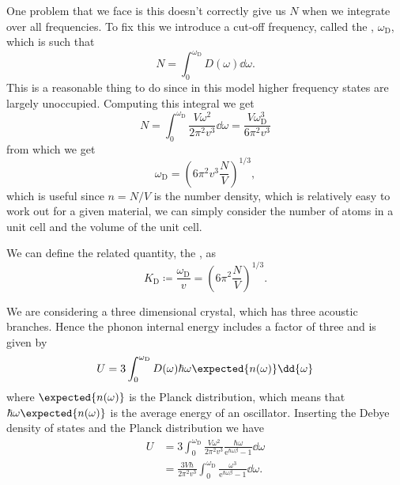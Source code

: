 \documentclass[fleqn]{NotesClass}
\newcommand*{\e}{\mathrm{e}}
\newcommand*{\debye}{\mathrm{D}}
\begin{document}
    One problem that we face is this doesn't correctly give us \(N\) when we integrate over all frequencies.
    To fix this we introduce a cut-off frequency, called the , \(\omega_{\debye}\), which is such that
    \begin{equation}
        N = \int_0^{\omega_{\debye}} D(\omega) \dd{\omega}.
    \end{equation}
    This is a reasonable thing to do since in this model higher frequency states are largely unoccupied.
    Computing this integral we get
    \begin{equation}
        N = \int_{0}^{\omega_{\debye}} \frac{V\omega^2}{2\pi^2v^3} \dd{\omega} = \frac{V\omega_{\debye}^{3}}{6\pi^2v^3}
    \end{equation}
    from which we get
    \begin{equation}
        \omega_{\debye} = (6\pi^2v^3 \frac{N}{V})^{1/3},
    \end{equation}
    which is useful since \(n = N/V\) is the number density, which is relatively easy to work out for a given material, we can simply consider the number of atoms in a unit cell and the volume of the unit cell.
    
    We can define the related quantity, the , as
    \begin{equation}
        K_{\debye} \coloneqq \frac{\omega_{\debye}}{v} = \left( 6\pi^2\frac{N}{V} \right)^{1/3}.
    \end{equation}
    
    We are considering a three dimensional crystal, which has three acoustic branches.
    Hence the phonon internal energy includes a factor of three and is given by
    \begin{equation}
        U = 3 \int_{0}^{\omega_{\debye}} D(\omega) \hbar\omega \expected{n(\omega)} \dd{\omega}
    \end{equation}
    where \(\expected{n(\omega)}\) is the Planck distribution, which means that \(\hbar\omega\expected{n(\omega)}\) is the average energy of an oscillator.
    Inserting the Debye density of states and the Planck distribution we have
    \begin{align}
        U &= 3\int_{0}^{\omega_{\debye}} \frac{V\omega^2}{2\pi^2v^3} \frac{\hbar\omega}{\e^{\hbar\omega\beta} - 1} \dd{\omega}\\
        &= \frac{3V\hbar}{2\pi^2v^3} \int_{0}^{\omega_{\debye}} \frac{\omega^3}{\e^{\hbar\omega\beta} - 1} \dd{\omega}.
    \end{align}
    
\end{document}

